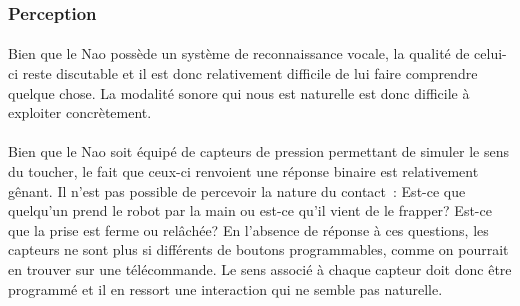\subsubsection{Perception}
\paragraph{}
Bien que le Nao possède un système de reconnaissance vocale, la qualité de
celui-ci reste discutable et il est donc relativement difficile de lui
faire comprendre quelque chose. La modalité sonore qui nous est
naturelle est donc difficile à exploiter concrètement.

\paragraph{}
Bien que le Nao soit équipé de capteurs de pression permettant de simuler le
sens du toucher, le fait que ceux-ci renvoient une réponse binaire est
relativement gênant. Il n'est pas possible de percevoir la nature du
contact~: Est-ce que quelqu'un prend le robot par la main ou est-ce qu'il
vient de le frapper? Est-ce que la prise est ferme ou relâchée? En l'absence
de réponse à ces questions, les capteurs ne sont plus si différents de
boutons programmables, comme on pourrait en trouver sur une télécommande.
Le sens associé à chaque capteur doit donc être programmé et il en ressort
une interaction qui ne semble pas naturelle.

